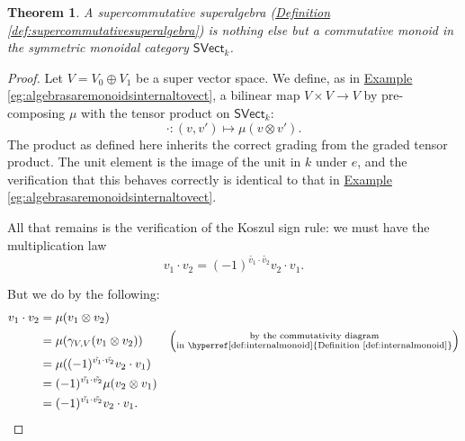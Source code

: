 \documentclass[a4paper,10pt]{scrreprt}
\theoremstyle{definition}
\theoremstyle{plain}
\newtheorem{theorem}{Theorem}[section]
\theoremstyle{remark}
\begin{document}
\begin{theorem}
  A supercommutative superalgebra (\hyperref[def:supercommutativesuperalgebra]{Definition \ref*{def:supercommutativesuperalgebra}}) is nothing else but a commutative monoid in the symmetric monoidal category $\mathsf{SVect}_{k}$.
\end{theorem}
\begin{proof}
  Let $V = V_{0} \oplus V_{1}$ be a super vector space. We define, as in \hyperref[eg:algebrasaremonoidsinternaltovect]{Example \ref*{eg:algebrasaremonoidsinternaltovect}}, a bilinear map $V \times V \to V$ by pre-composing $\mu$ with the tensor product on $\mathsf{SVect}_{k}$:
  \begin{equation*}
    \cdot\colon (v, v') \mapsto \mu(v \otimes v').
  \end{equation*}
  The product as defined here inherits the correct grading from the graded tensor product. The unit element is the image of the unit in $k$ under $e$, and the verification that this behaves correctly is identical to that in \hyperref[eg:algebrasaremonoidsinternaltovect]{Example \ref*{eg:algebrasaremonoidsinternaltovect}}.

  All that remains is the verification of the Koszul sign rule: we must have the multiplication law
  \begin{equation*}
    v_{1} \cdot v_{2} = (-1)^{\tilde{v_{1}} \cdot \tilde{v_{2}}} v_{2} \cdot v_{1}.
  \end{equation*}

  But we do by the following:
  \begin{align*}
    v_{1} \cdot v_{2} &= \mu(v_{1} \otimes v_{2}) \\
    &= \mu(\gamma_{V, V}(v_{1} \otimes v_{2})) &\left( \substack{\text{by the commutativity diagram}\\ \text{in \hyperref[def:internalmonoid]{Definition \ref*{def:internalmonoid}}}} \right)\\ 
    &= \mu((-1)^{\tilde{v_{1}} \cdot \tilde{v_{2}}} v_{2} \cdot v_{1}) \\
    &= (-1)^{\tilde{v_{1}} \cdot \tilde{v_{2}}} \mu(v_{2} \otimes v_{1}) \\
    &= (-1)^{\tilde{v_{1}} \cdot \tilde{v_{2}}} v_{2} \cdot v_{1}.
  \end{align*}
\end{proof} 
\end{document}
